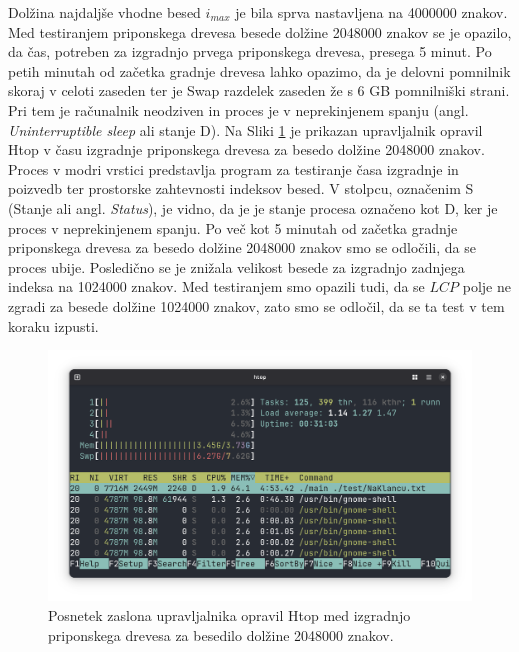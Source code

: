 Dolžina najdaljše vhodne besed $i_{max}$ je bila sprva nastavljena na 4000000 znakov. Med testiranjem priponskega drevesa besede dolžine 2048000 znakov se je opazilo, da čas, potreben za izgradnjo prvega priponskega drevesa, presega 5 minut. Po petih minutah od začetka gradnje drevesa lahko opazimo, da je delovni pomnilnik skoraj v celoti zaseden ter je Swap razdelek zaseden že s 6 GB pomnilniški strani. Pri tem je računalnik neodziven in proces je v neprekinjenem spanju (angl. \textit{Uninterruptible sleep} ali stanje D). Na Sliki \ref{fig:6GB} je prikazan upravljalnik opravil Htop v času izgradnje priponskega drevesa za besedo dolžine 2048000 znakov. Proces v modri vrstici predstavlja program za testiranje časa izgradnje in poizvedb ter prostorske zahtevnosti indeksov besed. V stolpcu, označenim S (Stanje ali angl. \textit{Status}), je vidno, da je je stanje procesa označeno kot D, ker je proces v neprekinjenem spanju. Po več kot 5 minutah od začetka gradnje priponskega drevesa za besedo dolžine 2048000 znakov smo se odločili, da se proces ubije. Posledično se je znižala velikost besede za izgradnjo zadnjega indeksa na 1024000 znakov. Med testiranjem smo opazili tudi, da se $LCP$ polje ne zgradi za besede dolžine 1024000 znakov, zato smo se odločil, da se ta test v tem koraku izpusti.

\begin{figure}[tb]
    \centering
    \includegraphics[width=\textwidth]{Slike/Zaslonski posnetek 2025-06-23 22-53-56.png}

    \caption{Posnetek zaslona upravljalnika opravil Htop med izgradnjo priponskega drevesa za besedilo dolžine 2048000 znakov.} 
    \label{fig:6GB}
\end{figure}



